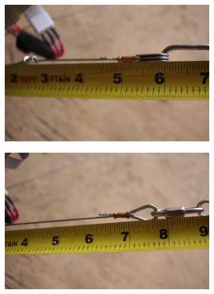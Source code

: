 \begin{appendices}

\begin{figure}[htp] %
\centering
\begin{subfigure}{.5\textwidth}
\centering
\includegraphics[width=0.9\linewidth]{tex/img/ruler_6}%
\label{fig:ruler_6}%
\end{subfigure}%
\begin{subfigure}{.5\textwidth}
\centering
\includegraphics[width=0.9\linewidth]{tex/img/ruler_8}%
\label{fig:ruler_8}%
\end{subfigure}%


\end{figure}
\end{appendices}
